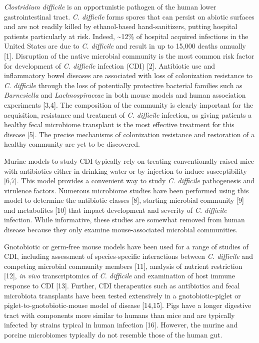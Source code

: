 \documentclass[11pt,]{article}
\begin{document}
\emph{Clostridium difficile} is an opportunistic pathogen of the human
lower gastrointestinal tract. \emph{C. difficile} forms spores that can
persist on abiotic surfaces and are not readily killed by ethanol-based
hand-sanitizers, putting hospital patients particularly at risk. Indeed,
\textasciitilde{}12\% of hospital acquired infections in the United
States are due to \emph{C. difficile} and result in up to 15,000 deaths
annually {[}1{]}. Disruption of the native microbial community is the
most common risk factor for development of \emph{C. difficile} infection
(CDI) {[}2{]}. Antibiotic use and inflammatory bowel diseases are
associated with loss of colonization resistance to \emph{C. difficile}
through the loss of potentially protective bacterial families such as
\emph{Barnesiella} and \emph{Lachnospiraceae} in both mouse models and
human association experiments {[}3,4{]}. The composition of the
community is clearly important for the acquisition, resistance and
treatment of \emph{C. difficile} infection, as giving patients a healthy
fecal microbiome transplant is the most effective treatment for this
disease {[}5{]}. The precise mechanisms of colonization resistance and
restoration of a healthy community are yet to be discovered.

Murine models to study CDI typically rely on treating
conventionally-raised mice with antibiotics either in drinking water or
by injection to induce susceptibility {[}6,7{]}. This model provides a
convenient way to study \emph{C. difficile} pathogenesis and virulence
factors. Numerous microbiome studies have been performed using this
model to determine the antibiotic classes {[}8{]}, starting microbial
community {[}9{]} and metabolites {[}10{]} that impact development and
severity of \emph{C. difficile} infection. While informative, these
studies are somewhat removed from human disease because they only
examine mouse-associated microbial communities.

Gnotobiotic or germ-free mouse models have been used for a range of
studies of CDI, including assessment of species-specific interactions
between \emph{C. difficile} and competing microbial community members
{[}11{]}, analysis of nutrient restriction {[}12{]}, \emph{in vivo}
transcriptomics of \emph{C. difficile} and examination of host immune
response to CDI {[}13{]}. Further, CDI therapeutics such as antibiotics
and fecal microbiota transplants have been tested extensively in a
gnotobiotic-piglet or piglet-to-gnotobiotic-mouse model of disease
{[}14,15{]}. Pigs have a longer digestive tract with components more
similar to humans than mice and are typically infected by strains
typical in human infection {[}16{]}. However, the murine and porcine
microbiomes typically do not resemble those of the human gut.
\end{document}
